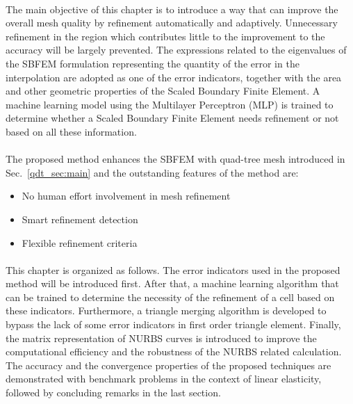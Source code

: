 \paragraph{}
The main objective of this chapter is to introduce a way that can improve the overall mesh quality by refinement automatically and adaptively.
Unnecessary refinement in the region which contributes little to the improvement to the accuracy will be largely prevented.
The expressions related to the eigenvalues of the SBFEM formulation representing the quantity of the error in the interpolation are adopted as one of the error indicators, together with the area and other geometric properties of the Scaled Boundary Finite Element.
A machine learning model using the Multilayer Perceptron (MLP) is trained to determine whether a Scaled Boundary Finite Element needs refinement or not based on all these information.

\paragraph{}
The proposed method enhances the SBFEM with quad-tree mesh introduced in Sec.~\ref{qdt_sec:main} and the outstanding features of the method are:
\begin{itemize}
    \item No human effort involvement in mesh refinement
    \item Smart refinement detection
    \item Flexible refinement criteria
\end{itemize}

\paragraph{}
This chapter is organized as follows.
The error indicators used in the proposed method will be introduced first.
After that, a machine learning algorithm that can be trained to determine the necessity of the refinement of a cell based on these indicators.
Furthermore, a triangle merging algorithm is developed to bypass the lack of some error indicators in first order triangle element.
Finally, the matrix representation of NURBS curves is introduced to improve the computational efficiency and the robustness of the NURBS related calculation.
The accuracy and the convergence properties of the proposed techniques are demonstrated with benchmark problems in the context of linear elasticity, followed by concluding remarks in the last section.
